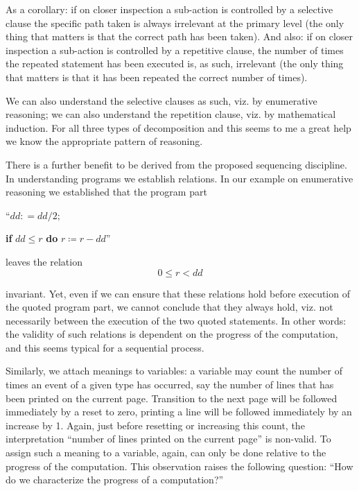 As a corollary: if on closer inspection a sub-action is controlled by a selective clause the specific path taken is always irrelevant at the primary level (the only thing that matters is that the correct path has been taken). And also: if on closer inspection a sub-action is controlled by a repetitive clause, the number of times the repeated statement has been executed is, as such, irrelevant (the only thing that matters is that it has been repeated the correct number of times).

We can also understand the selective clauses as such, viz. by enumerative reasoning; we can also understand the repetition clause, viz. by mathematical induction. For all three types of decomposition \textemdash{}  and this seems to me a great help \textemdash{}  we know the appropriate pattern of reasoning.

There is a further benefit to be derived from the proposed sequencing discipline. In understanding programs we establish relations. In our example on enumerative reasoning we established that the program part
\medskip

{
	\setlength{\parindent}{8em}
	\hspace{-.4em}``$dd: = dd/2;$
	
	\textbf{if} $dd \leqslant r$ \textbf{do} $r \coloneq r - dd$''
}
\medskip

\noindent
leaves the relation
$$
0 \leqslant r < dd
$$

\noindent
invariant. Yet, even if we can ensure that these relations hold before execution of the quoted program part, we cannot conclude that they always hold, viz. not necessarily between the execution of the two quoted statements. In other words: the validity of such relations is dependent on the progress of the computation, and this seems typical for a sequential process.

Similarly, we attach meanings to variables: a variable may count the number of times an event of a given type has occurred, say the number of lines that has been printed on the current page. Transition to the next page will be followed immediately by a reset to zero, printing a line will be followed immediately by an increase by 1. Again, just before resetting or increasing this count, the interpretation ``number of lines printed on the current page'' is non-valid. To assign such a meaning to a variable, again, can only be done relative to the progress of the computation. This observation raises the following question: ``How do we characterize the progress of a computation?''

